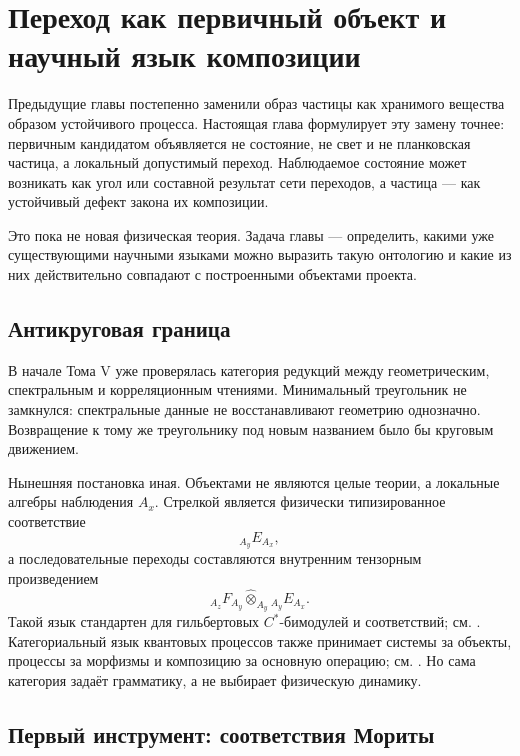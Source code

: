 \chapter{Переход как первичный объект и научный язык композиции}

Предыдущие главы постепенно заменили образ частицы как хранимого вещества
образом устойчивого процесса. Настоящая глава формулирует эту замену
точнее: первичным кандидатом объявляется не состояние, не свет и не
планковская частица, а локальный допустимый переход. Наблюдаемое состояние
может возникать как угол или составной результат сети переходов, а частица
--- как устойчивый дефект закона их композиции.

Это пока не новая физическая теория. Задача главы --- определить, какими
уже существующими научными языками можно выразить такую онтологию и какие
из них действительно совпадают с построенными объектами проекта.

\section{Антикруговая граница}

В начале Тома V уже проверялась категория редукций между геометрическим,
спектральным и корреляционным чтениями. Минимальный треугольник не замкнулся:
спектральные данные не восстанавливают геометрию однозначно. Возвращение к
тому же треугольнику под новым названием было бы круговым движением.

Нынешняя постановка иная. Объектами не являются целые теории, а локальные
алгебры наблюдения $A_x$. Стрелкой является физически типизированное
соответствие
\begin{equation}
 {}_{A_y}E_{A_x},
 \label{eq:v5-transition-correspondence}
\end{equation}
а последовательные переходы составляются внутренним тензорным
произведением
\begin{equation}
 {}_{A_z}F_{A_y}\widehat\otimes_{A_y}{}_{A_y}E_{A_x}.
 \label{eq:v5-transition-composition}
\end{equation}
Такой язык стандартен для гильбертовых $C^*$-бимодулей и соответствий;
см. . Категориальный язык квантовых процессов
также принимает системы за объекты, процессы за морфизмы и композицию за
основную операцию; см. . Но сама категория
задаёт грамматику, а не выбирает физическую динамику.

\section{Первый инструмент: соответствия Мориты}

